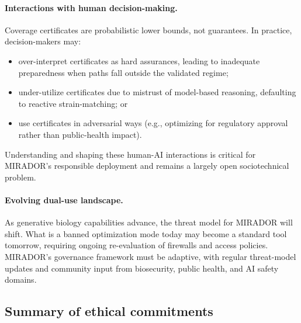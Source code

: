 \documentclass[11pt]{article}
\begin{document}
\paragraph{Interactions with human decision-making.}
Coverage certificates are probabilistic lower bounds, not guarantees. In practice, decision-makers
may:
\begin{itemize}
  \item over-interpret certificates as hard assurances, leading to inadequate preparedness when
        paths fall outside the validated regime;
  \item under-utilize certificates due to mistrust of model-based reasoning, defaulting to
        reactive strain-matching; or
  \item use certificates in adversarial ways (e.g., optimizing for regulatory approval rather
        than public-health impact).
\end{itemize}
Understanding and shaping these human-AI interactions is critical for MIRADOR's responsible
deployment and remains a largely open sociotechnical problem.

\paragraph{Evolving dual-use landscape.}
As generative biology capabilities advance, the threat model for MIRADOR will shift. What is a
banned optimization mode today may become a standard tool tomorrow, requiring ongoing re-evaluation
of firewalls and access policies. MIRADOR's governance framework must be adaptive, with regular
threat-model updates and community input from biosecurity, public health, and AI safety domains.

\subsection{Summary of ethical commitments}
\end{document}
